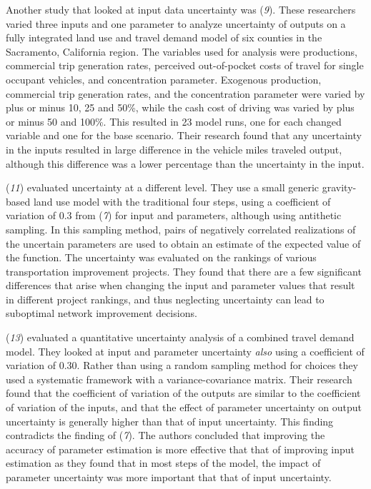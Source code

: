 \documentclass[
  letterpaper,
]{trb}
\begin{document}
Another study that looked at input data uncertainty was (\emph{9}).
These researchers varied three inputs and one parameter to analyze
uncertainty of outputs on a fully integrated land use and travel demand
model of six counties in the Sacramento, California region. The
variables used for analysis were productions, commercial trip generation
rates, perceived out-of-pocket costs of travel for single occupant
vehicles, and concentration parameter. Exogenous production, commercial
trip generation rates, and the concentration parameter were varied by
plus or minus 10, 25 and 50\%, while the cash cost of driving was varied
by plus or minus 50 and 100\%. This resulted in 23 model runs, one for
each changed variable and one for the base scenario. Their research
found that any uncertainty in the inputs resulted in large difference in
the vehicle miles traveled output, although this difference was a lower
percentage than the uncertainty in the input.

(\emph{11}) evaluated uncertainty at a different level. They use a small
generic gravity-based land use model with the traditional four steps,
using a coefficient of variation of 0.3 from (\emph{7}) for input and
parameters, although using antithetic sampling. In this sampling method,
pairs of negatively correlated realizations of the uncertain parameters
are used to obtain an estimate of the expected value of the function.
The uncertainty was evaluated on the rankings of various transportation
improvement projects. They found that there are a few significant
differences that arise when changing the input and parameter values that
result in different project rankings, and thus neglecting uncertainty
can lead to suboptimal network improvement decisions.

(\emph{13}) evaluated a quantitative uncertainty analysis of a combined
travel demand model. They looked at input and parameter uncertainty
\emph{also} using a coefficient of variation of 0.30. Rather than using
a random sampling method for choices they used a systematic framework
with a variance-covariance matrix. Their research found that the
coefficient of variation of the outputs are similar to the coefficient
of variation of the inputs, and that the effect of parameter uncertainty
on output uncertainty is generally higher than that of input
uncertainty. This finding contradicts the finding of (\emph{7}). The
authors concluded that improving the accuracy of parameter estimation is
more effective that that of improving input estimation as they found
that in most steps of the model, the impact of parameter uncertainty was
more important that that of input uncertainty.
\end{document}
